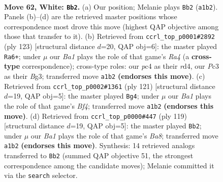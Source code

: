 \documentclass[11pt]{article}
\begin{document}
\clearpage

\begin{figure}[p]\centering
\begin{subfigure}{0.46\textwidth}\centering
\resizebox{\linewidth}{!}{%
\newchessgame
\chessboard[
  setfen={3k4/8/7R/pp4r1/b1p5/P1P1K3/8/B7 w - - 30 62},
  showmover=false,
  pgfstyle=straightmove, color=movearrow, markmove={a1-b2}
]}
\caption{}
\end{subfigure}\hfill
\begin{subfigure}{0.46\textwidth}\centering
\resizebox{\linewidth}{!}{%
\newchessgame
\chessboard[
  setfen={8/4k3/6K1/r7/3R2Bp/6bP/6P1/8 b - - 19 62},
  showmover=false,
  pgfstyle=straightmove, color=movearrow, markmove={a5-a6}
]}
\caption{}
\end{subfigure}
\\[4pt]
\begin{subfigure}{0.46\textwidth}\centering
\resizebox{\linewidth}{!}{%
\newchessgame
\chessboard[
  setfen={8/8/p7/PpB2b2/1P6/2P2k2/8/4K3 b - - 32 61},
  showmover=false,
  pgfstyle=straightmove, color=movearrow, markmove={f5-g4}
]}
\caption{}
\end{subfigure}\hfill
\begin{subfigure}{0.46\textwidth}\centering
\resizebox{\linewidth}{!}{%
\newchessgame
\chessboard[
  setfen={8/8/8/3k1p1p/5P1P/6P1/4KB2/b7 b - - 11 60},
  showmover=false,
  pgfstyle=straightmove, color=movearrow, markmove={a1-b2}
]}
\caption{}
\end{subfigure}
\caption{\textbf{Move 62, White: \texttt{Bb2}.} (a) Our position; Melanie plays \texttt{Bb2} (\texttt{a1b2}). Panels (b)--(d) are the retrieved master positions whose correspondence most drove this move (highest QAP objective among those that transfer to it). (b) Retrieved from \texttt{ccrl\_top\_p0001\#2892} (ply 123) [structural distance $d$=20, QAP obj=6]: the master played \texttt{Ra6+}; under $\mu$ our \emph{Ba1} plays the role of that game's \emph{Ra4} (a \textbf{cross-type} correspondence); cross-type roles: our \emph{p}c4 as their \emph{r}d4, our \emph{P}c3 as their \emph{B}g3; transferred move \texttt{a1b2} \textbf{(endorses this move)}. (c) Retrieved from \texttt{ccrl\_top\_p0002\#1361} (ply 121) [structural distance $d$=19, QAP obj=5]: the master played \texttt{Bg4}; under $\mu$ our \emph{Ba1} plays the role of that game's \emph{Bf4}; transferred move \texttt{a1b2} \textbf{(endorses this move)}. (d) Retrieved from \texttt{ccrl\_top\_p0000\#447} (ply 119) [structural distance $d$=19, QAP obj=5]: the master played \texttt{Bb2}; under $\mu$ our \emph{Ba1} plays the role of that game's \emph{Ba8}; transferred move \texttt{a1b2} \textbf{(endorses this move)}. Synthesis: 14 retrieved analogs transferred to \texttt{Bb2} (summed QAP objective 51, the strongest correspondence among the candidate moves); Melanie committed it via the \texttt{search} selector.}
\label{fig:thought-m122}
\end{figure}
\end{document}
